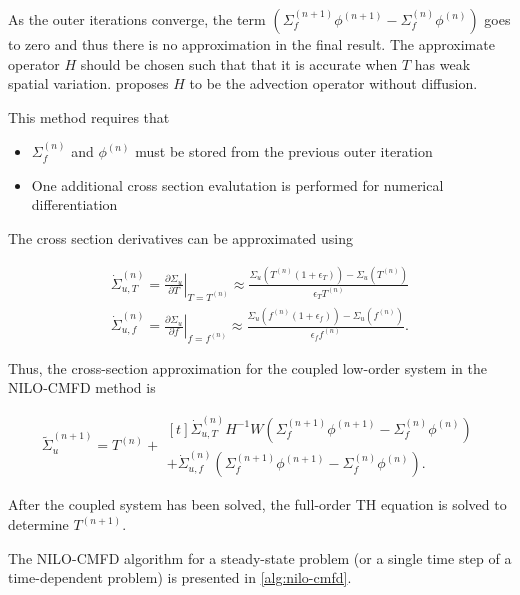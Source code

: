 \documentclass{proposal}
\begin{document}
As the outer iterations converge, the term $(\Sigma_f^{(n+1)} \phi^{(n+1)} - \Sigma_f^{(n)} \phi^{(n)})$ goes to zero and thus there is no approximation in the final result. The approximate operator $H$ should be chosen such that that it is accurate when $T$ has weak spatial variation. \cite{adamowicz2021nilo} proposes $H$ to be the advection operator without diffusion.

This method requires that

\begin{itemize}
    \item $\Sigma_f^{(n)}$ and $\phi^{(n)}$ must be stored from the previous outer iteration
    \item One additional cross section evalutation is performed for numerical differentiation
\end{itemize}

The cross section derivatives can be approximated using

\begin{gather}
    \dot{\Sigma}_{u, T}^{(n)} = \left.\frac{\partial \Sigma_u}{\partial T}\right|_{T=T^{(n)}} \approx \frac{\Sigma_u(T^{(n)}(1+\epsilon_T)) - \Sigma_u(T^{(n)})}{\epsilon_T T^{(n)}}\\
    \dot{\Sigma}_{u, f}^{(n)} = \left.\frac{\partial \Sigma_u}{\partial f}\right|_{f=f^{(n)}} \approx \frac{\Sigma_u(f^{(n)}(1+\epsilon_f)) - \Sigma_u(f^{(n)})}{\epsilon_f f^{(n)}}.
\end{gather}

Thus, the cross-section approximation for the coupled low-order system in the NILO-CMFD method is

\begin{equation}
    \tilde{\Sigma}_u^{(n+1)} = T^{(n)} + \begin{multlined}[t]
        \dot{\Sigma}_{u, T}^{(n)}H^{-1}W(\Sigma_f^{(n+1)} \phi^{(n+1)} - \Sigma_f^{(n)} \phi^{(n)}) \\
        + \dot{\Sigma}_{u, f}^{(n)}(\Sigma_f^{(n+1)} \phi^{(n+1)} - \Sigma_f^{(n)} \phi^{(n)}).\end{multlined}\label{eq:xs-approx}
\end{equation}

After the coupled system has been solved, the full-order TH equation is solved to determine $T^{(n+1)}$.

The NILO-CMFD algorithm for a steady-state problem (or a single time step of a time-dependent problem) is presented in \autoref{alg:nilo-cmfd}.
\end{document}
